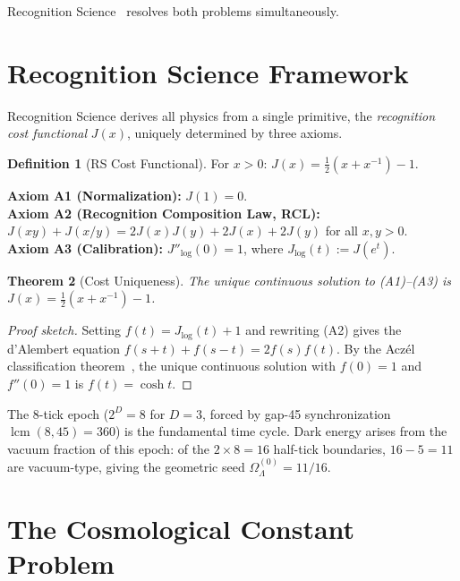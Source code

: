 \documentclass[12pt,a4paper]{article}
\newtheorem{theorem}{Theorem}[section]
\theoremstyle{definition}
\newtheorem{definition}[theorem]{Definition}
\theoremstyle{remark}
\begin{document}
Recognition Science~\cite{RS_Axioms} resolves both problems
simultaneously.

\section{Recognition Science Framework}
\label{sec:framework}

Recognition Science derives all physics from a single primitive,
the \emph{recognition cost functional} $J(x)$, uniquely determined
by three axioms.

\begin{definition}[RS Cost Functional]
For $x > 0$: $J(x) = \tfrac{1}{2}(x + x^{-1}) - 1$.
\end{definition}

\noindent\textbf{Axiom A1 (Normalization):} $J(1) = 0$.\\
\textbf{Axiom A2 (Recognition Composition Law, RCL):}
$J(xy) + J(x/y) = 2J(x)J(y) + 2J(x) + 2J(y)$ for all $x, y > 0$.\\
\textbf{Axiom A3 (Calibration):} $J''_{\log}(0) = 1$, where
$J_{\log}(t) := J(e^t)$.

\begin{theorem}[Cost Uniqueness]
\label{thm:unique}
The unique continuous solution to \textup{(A1)--(A3)} is
$J(x) = \tfrac{1}{2}(x + x^{-1}) - 1$.
\end{theorem}

\begin{proof}[Proof sketch]
Setting $f(t) = J_{\log}(t) + 1$ and rewriting \textup{(A2)} gives the
d'Alembert equation $f(s+t) + f(s-t) = 2f(s)f(t)$.  By the Acz\'el
classification theorem~\cite{Aczel1966}, the unique continuous solution
with $f(0) = 1$ and $f''(0) = 1$ is $f(t) = \cosh t$.
\end{proof}

\noindent The 8-tick epoch ($2^D = 8$ for $D = 3$, forced by gap-45
synchronization $\operatorname{lcm}(8,45) = 360$) is the fundamental time
cycle.  Dark energy arises from the vacuum fraction of this epoch:
of the $2 \times 8 = 16$ half-tick boundaries, $16 - 5 = 11$ are
vacuum-type, giving the geometric seed $\Omega_\Lambda^{(0)} = 11/16$.

\section{The Cosmological Constant Problem}
\label{sec:cc-problem}
\end{document}
